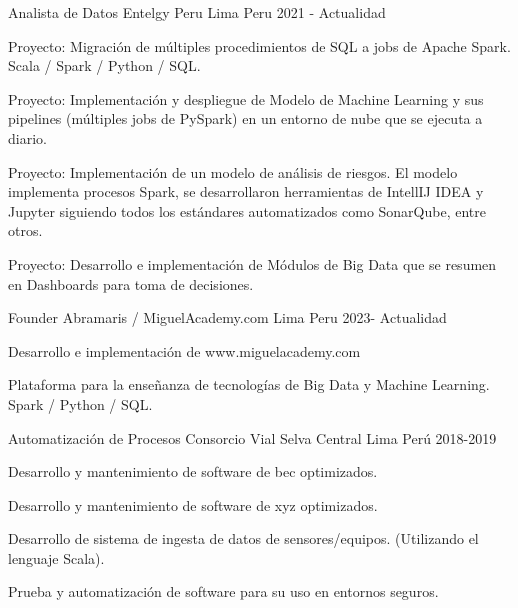 

\begin{cventries}

  \cventry
    {Analista de Datos} %
    {Entelgy Peru} %
    {Lima Peru} %
    {2021 - Actualidad} %
    {
      \begin{cvitems} %
        \item {Proyecto: Migraci\'on de m\'ultiples procedimientos de SQL a jobs de Apache Spark. Scala / Spark / Python / SQL.}
        \item {Proyecto: Implementaci\'on y despliegue de Modelo de Machine Learning y sus pipelines (m\'ultiples jobs de PySpark) en un entorno de nube que se ejecuta a diario.}
        \item {Proyecto: Implementaci\'on de un modelo de an\'alisis de riesgos. El modelo implementa procesos Spark, se desarrollaron herramientas de IntellIJ IDEA y Jupyter siguiendo todos los est\'andares automatizados como SonarQube, entre otros.}
        \item {Proyecto: Desarrollo e implementaci\'on de M\'odulos de Big Data que se resumen en Dashboards para toma de decisiones.}
      \end{cvitems}
    }

  \cventry
  {Founder} %
  {Abramaris / MiguelAcademy.com} %
  {Lima Peru} %
  {2023- Actualidad} %
  {
    \begin{cvitems} %
      \item {Desarrollo e implementaci\'on de www.miguelacademy.com}
      \item {Plataforma para la enseñanza de tecnolog\'ias de Big Data y Machine Learning. Spark / Python / SQL.}
    \end{cvitems}
  }
  \cventry
  {Automatizaci\'on de Procesos} %
  {Consorcio Vial Selva Central} %
  {Lima Per\'u} %
  {2018-2019} %
  {
    \begin{cvitems} %
      \item {Desarrollo y mantenimiento de software de bec optimizados.}
      \item {Desarrollo y mantenimiento de software de xyz optimizados.}
      \item {Desarrollo de sistema de ingesta de datos de sensores/equipos. (Utilizando el lenguaje Scala).}
      \item {Prueba y automatizaci\'on de software para su uso en entornos seguros.}


\end{cvitems}}
\end{cventries}
